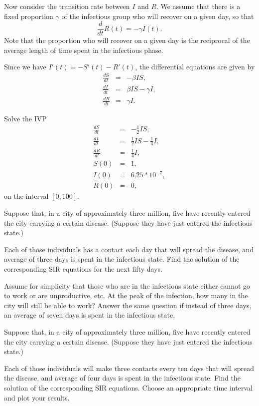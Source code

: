  Now consider the transition rate between $I$ and $R$. We assume that there is a fixed proportion $\gamma$ of the infectious group who will recover on a given day, so that 
 \[\frac{d}{dt}R(t) = -\gamma I(t).\]
 Note that the proportion who will recover on a given day is the reciprocal of the average length of time spent in the infectious phase. 
 
 Since we have $I'(t) = - S'(t) - R'(t)$, the  differential equations are given by
\begin{eqnarray*}
\frac{dS}{dt} &=&-\beta IS ,\\
\frac{dI}{dt} &=& \beta I S-\gamma I, \\
\frac{dR}{dt} &=&\gamma I.
\end{eqnarray*}


\begin{problem}
Solve the IVP
\begin{eqnarray*}
\frac{dS}{dt} &=&-\frac{1}{2} IS ,\\
\frac{dI}{dt} &=& \frac{1}{2} I S-\frac{1}{4} I, \\
\frac{dR}{dt} &=&\frac{1}{4} I,\\
S(0) &=& 1,\\
I(0) &=& 6.25*10^{-7},\\
R(0) &=&0,
\end{eqnarray*}
on the interval $[0,100]$.
\end{problem}


\begin{problem}
Suppose that, in a city of approximately three million, five have recently entered the city carrying a certain disease. (Suppose they have just entered the infectious state.)

Each of those individuals has a contact each day that will spread the disease, and average of three days is spent in the infectious state. Find the solution of the corresponding SIR equations for the next fifty days. 

Assume for simplicity that those who are in the infectious state either cannot go to work or are unproductive, etc. At the peak of the infection, how many in the city will still be able to work? 
Answer the same question if instead of three days, an average of seven days is spent in the infectious state.
\end{problem}


\begin{problem}
Suppose that, in a city of approximately three million, five have recently entered the city carrying a certain disease. (Suppose they have just entered the infectious state.) 

Each of those individuals will make three contacts every ten days that will spread the disease, and average of four days is spent in the infectious state. Find the solution of the corresponding SIR equations. Choose an appropriate time interval and plot your results.
\end{problem}